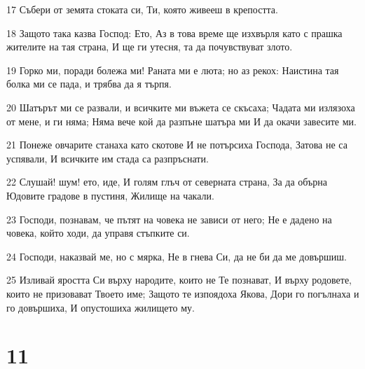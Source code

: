 \par 17 Събери от земята стоката си, Ти, която живееш в крепостта.
\par 18 Защото така казва Господ: Ето, Аз в това време ще изхвърля като с прашка жителите на тая страна, И ще ги утесня, та да почувствуват злото.
\par 19 Горко ми, поради болежа ми! Раната ми е люта; но аз рекох: Наистина тая болка ми се пада, и трябва да я търпя.
\par 20 Шатърът ми се развали, и всичките ми въжета се скъсаха; Чадата ми излязоха от мене, и ги няма; Няма вече кой да разпъне шатъра ми И да окачи завесите ми.
\par 21 Понеже овчарите станаха като скотове И не потърсиха Господа, Затова не са успявали, И всичките им стада са разпръснати.
\par 22 Слушай! шум! ето, иде, И голям глъч от северната страна, За да обърна Юдовите градове в пустиня, Жилище на чакали.
\par 23 Господи, познавам, че пътят на човека не зависи от него; Не е дадено на човека, който ходи, да управя стъпките си.
\par 24 Господи, наказвай ме, но с мярка, Не в гнева Си, да не би да ме довършиш.
\par 25 Изливай яростта Си върху народите, които не Те познават, И върху родовете, които не призовават Твоето име; Защото те изпоядоха Якова, Дори го погълнаха и го довършиха, И опустошиха жилището му.

\chapter{11}

